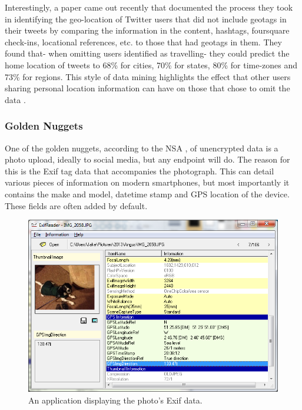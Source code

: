 Interestingly, a paper \cite{intro:twitter_home_location} came out recently that documented the process they took in identifying the geo-location of Twitter users that did not include geotags in their tweets by comparing the information in the content, hashtags, foursquare \cite{intro:foursquare_site} check-ins, locational references, etc. to those that had geotags \cite{intro:twitter_location_howto} in them. They found that- when omitting users identified as travelling- they could predict the home location of tweets to 68\% for cities, 70\% for states, 80\% for time-zones and 73\% for regions. This style of data mining highlights the effect that other users sharing personal location information can have on those that chose to omit the data \cite{intro:not_personal}. 

\subsubsection{Golden Nuggets}

One of the golden nuggets, according to the NSA \cite{intro:angry_leak}, of unencrypted data is a photo upload, ideally to social media, but any endpoint will do. The reason for this is the Exif \cite{intro:exif_wiki} tag data that accompanies the photograph. This can detail various pieces of information on modern smartphones, but most importantly it contains the make and model, datetime stamp and GPS location \cite{intro:wiki_geotag} of the device. These fields are often added by default. 

\begin{figure}[htb!]
\centering\includegraphics{intro/diagrams/exif-data.png}
\caption{An application displaying the photo's Exif data.}
\label{angus}
\end{figure}
\clearpage

